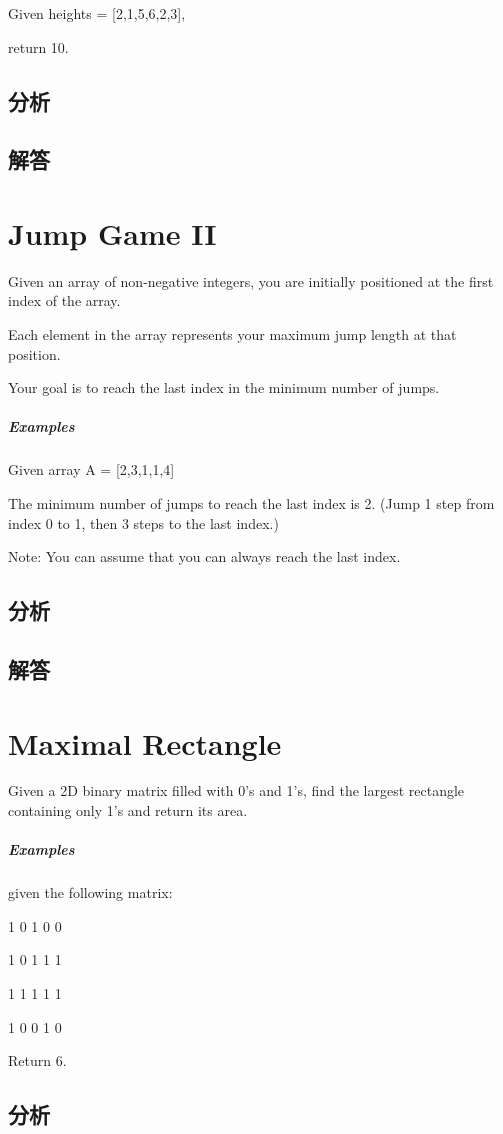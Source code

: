 \documentclass[UTF8,a4paper,12pt]{ctexbook}
\begin{document}
		Given heights = [2,1,5,6,2,3],
		
		return 10.
	\subsection{分析}
	
	\subsection{解答}
	
	
\section{Jump Game II}
		Given an array of non-negative integers, you are initially positioned at the first index of the array.
		
		Each element in the array represents your maximum jump length at that position.
		
		Your goal is to reach the last index in the minimum number of jumps.
	\subparagraph{Examples}
		Given array A = [2,3,1,1,4]
		
		The minimum number of jumps to reach the last index is 2. (Jump 1 step from index 0 to 1, then 3 steps to the last index.)
		
		Note:
		You can assume that you can always reach the last index.
	\subsection{分析}
	
	\subsection{解答}
	
	
\section{Maximal Rectangle}
		Given a 2D binary matrix filled with 0's and 1's, find the largest rectangle containing only 1's and return its area.
	\subparagraph{Examples}
		given the following matrix:
		
		1 0 1 0 0
		
		1 0 1 1 1
		
		1 1 1 1 1
		
		1 0 0 1 0
		
		Return 6.
	\subsection{分析}
	
\end{document}
